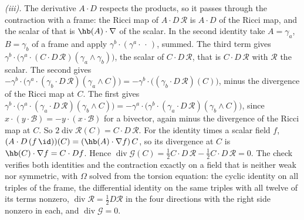 \emph{(iii).} The derivative $A \cdot D$ respects the products, so it passes through the contraction with a frame: the Ricci map of $A \cdot D\,\mathcal{R}$ is $A \cdot D$ of the Ricci map, and the scalar of that is $\hb(A) \cdot \nabla$ of the scalar. In the second identity take $A = \gamma_{a}$, $B = \gamma_{b}$ of a frame and apply $\gamma^{b} \cdot (\gamma^{a} \cdot\,\cdot\,)$, summed. The third term gives $\gamma^{b} \cdot \bigl(\gamma^{a} \cdot (C \cdot D\,\mathcal{R})(\gamma_{a} \wedge \gamma_{b})\bigr)$, the scalar of $C \cdot D\,\mathcal{R}$, that is $C \cdot D\,\mathcal{R}$ with $\mathcal{R}$ the scalar. The second gives $-\gamma^{b} \cdot \bigl(\gamma^{a} \cdot (\gamma_{b} \cdot D\,\mathcal{R})(\gamma_{a} \wedge C)\bigr) = -\gamma^{b} \cdot \bigl((\gamma_{b} \cdot D\,\mathcal{R})(C)\bigr)$, minus the divergence of the Ricci map at $C$. The first gives $\gamma^{b} \cdot \bigl(\gamma^{a} \cdot (\gamma_{a} \cdot D\,\mathcal{R})(\gamma_{b} \wedge C)\bigr) = -\gamma^{a} \cdot \bigl(\gamma^{b} \cdot (\gamma_{a} \cdot D\,\mathcal{R})(\gamma_{b} \wedge C)\bigr)$, since $x \cdot (y \cdot \mathcal{B}) = -y \cdot (x \cdot \mathcal{B})$ for a bivector, again minus the divergence of the Ricci map at $C$. So $2\operatorname{div}\mathcal{R}(C) = C \cdot D\,\mathcal{R}$. For the identity times a scalar field $f$, $(A \cdot D\,(f\,\id))(C) = (\hb(A) \cdot \nabla f)\,C$, so its divergence at $C$ is $\hb(C) \cdot \nabla f = C \cdot D f$. Hence $\operatorname{div}\mathcal{G}(C) = \tfrac12 C \cdot D\,\mathcal{R} - \tfrac12 C \cdot D\,\mathcal{R} = 0$. The check verifies both identities and the contraction exactly on a field that is neither weak nor symmetric, with $\Omega$ solved from the torsion equation: the cyclic identity on all triples of the frame, the differential identity on the same triples with all twelve of its terms nonzero, $\operatorname{div}\mathcal{R} = \tfrac12 D\mathcal{R}$ in the four directions with the right side nonzero in each, and $\operatorname{div}\mathcal{G} = 0$.

